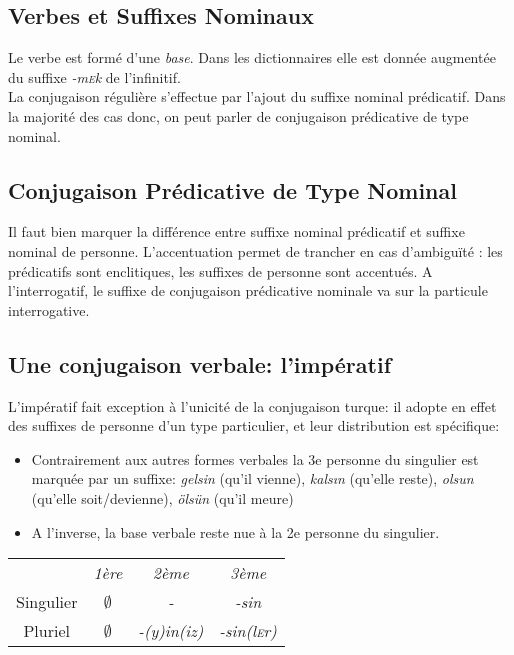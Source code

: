\documentclass{cours}
\newcommand{\sce}{\textsc{e}}
\begin{document}
\subsection{Verbes et Suffixes Nominaux}
Le verbe est formé d'une \emph{base}. Dans les dictionnaires elle est donnée augmentée du suffixe \textsl{-m\sce k} de l'infinitif.\\
La conjugaison régulière s'effectue par l'ajout du suffixe nominal prédicatif. Dans la majorité des cas donc, on peut parler de conjugaison prédicative de type nominal.

\subsection{Conjugaison Prédicative de Type Nominal}
Il faut bien marquer la différence entre suffixe nominal prédicatif et suffixe nominal de personne. L'accentuation permet de trancher en cas d'ambiguïté : les prédicatifs sont enclitiques, les suffixes de personne sont accentués. A l'interrogatif, le suffixe de conjugaison prédicative nominale va sur la particule interrogative. 

\subsection{Une conjugaison verbale: l'impératif}
L'impératif fait exception à l'unicité de la conjugaison turque: il adopte en effet des suffixes de personne d'un type particulier, et leur distribution est spécifique:
\begin{itemize}
    \item Contrairement aux autres formes verbales la 3e personne du singulier est marquée par un suffixe: \textsl{gelsin} (qu'il vienne), \textsl{kals\i n} (qu'elle reste), \textsl{olsun} (qu'elle soit/devienne), \textsl{ölsün} (qu'il meure)
    \item A l'inverse, la base verbale reste nue à la 2e personne du singulier.
\end{itemize}
\begin{center}
    \begin{tabular}{c>{\sl}c>{\sl}c>{\sl}c}
                  & 1ère        & 2ème       & 3ème          \\
        Singulier & $\emptyset$ & -          & -sin          \\
        Pluriel   & $\emptyset$ & -(y)in(iz) & -sin(l\sce r)
    \end{tabular}
\end{center}
\end{document}
